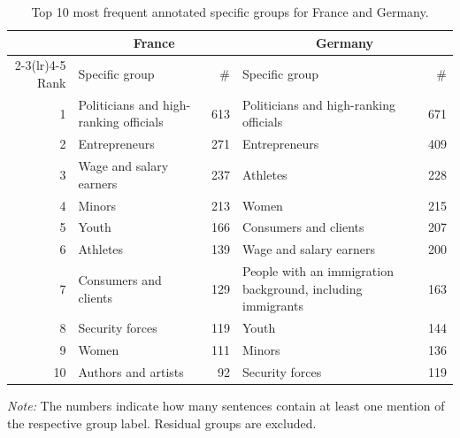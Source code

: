 \begin{table}[htbp]
\centering
\begin{threeparttable}
\begin{tabularx}{\textwidth}{r X r X r}
\toprule
 & \multicolumn{2}{c}{France} & \multicolumn{2}{c}{Germany} \\
\cmidrule(lr){2-3}\cmidrule(lr){4-5}
Rank & Specific group & \# & Specific group & \# \\
\midrule
1 & Politicians and high-ranking officials & 613 & Politicians and high-ranking officials & 671 \\
2 & Entrepreneurs & 271 & Entrepreneurs & 409 \\
3 & Wage and salary earners & 237 & Athletes & 228 \\
4 & Minors & 213 & Women & 215 \\
5 & Youth & 166 & Consumers and clients & 207 \\
6 & Athletes & 139 & Wage and salary earners & 200 \\
7 & Consumers and clients & 129 & People with an immigration background, including immigrants & 163 \\
8 & Security forces & 119 & Youth & 144 \\
9 & Women & 111 & Minors & 136 \\
10 & Authors and artists & 92 & Security forces & 119 \\
\bottomrule
\end{tabularx}
\begin{tablenotes}[flushleft]
\footnotesize
\item \textit{Note:} The numbers indicate how many sentences contain at least one mention of the respective group label. Residual groups are excluded.
\end{tablenotes}
\end{threeparttable}
\caption{Top 10 most frequent annotated specific groups for France and Germany.}
\label{tab:manual-annotation-top-10}
\end{table}
